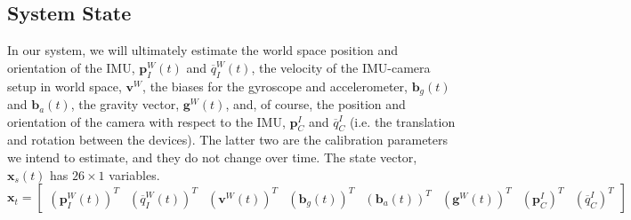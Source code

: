 \documentclass[letterpaper]{article}
\newcommand{\bb}[1]{\mathbf{#1}}
\begin{document}
\subsection{System State}

In our system, we will ultimately estimate the world space position
and orientation of the IMU, $\bb{p}_I^W(t)$ and
${\overline{q}}_I^W(t)$, the velocity of the IMU-camera setup in world
space, $\bb{v}^W$, the biases for the gyroscope and accelerometer,
$\bb{b}_g(t)$ and $\bb{b}_a(t)$, the gravity vector, $\bb{g}^W(t)$,
and, of course, the position and orientation of the camera with
respect to the IMU, $\bb{p}_C^I$ and $\overline{q}_C^I$ (i.e. the
translation and rotation between the devices). The latter two are the
calibration parameters we intend to estimate, and they do not change
over time. The state vector, $\bb{x}_s(t)$ has $26 \times 1$
variables.
\begin{equation}
\bb{x}_t=\begin{bmatrix} (\bb{p}_I^W(t))^T & ({\overline{q}}_I^W(t))^T  & (\bb{v}^W(t))^T  & (\bb{b}_g(t))^T &  (\bb{b}_a(t))^T & (\bb{g}^W(t))^T  & (\bb{p}_C^I)^T & (\overline{q}_C^I)^T\end{bmatrix}
\label{eq:UKF-state}
\end{equation}
\end{document}
